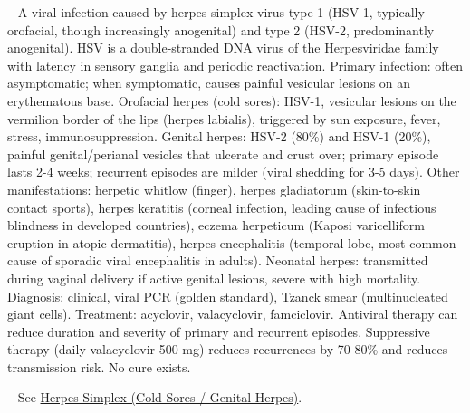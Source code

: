 -- A viral infection caused by herpes simplex virus type 1 (HSV-1, typically orofacial, though increasingly anogenital) and type 2 (HSV-2, predominantly anogenital). HSV is a double-stranded DNA virus of the Herpesviridae family with latency in sensory ganglia and periodic reactivation. Primary infection: often asymptomatic; when symptomatic, causes painful vesicular lesions on an erythematous base. Orofacial herpes (cold sores): HSV-1, vesicular lesions on the vermilion border of the lips (herpes labialis), triggered by sun exposure, fever, stress, immunosuppression. Genital herpes: HSV-2 (80\%) and HSV-1 (20\%), painful genital/perianal vesicles that ulcerate and crust over; primary episode lasts 2-4 weeks; recurrent episodes are milder (viral shedding for 3-5 days). Other manifestations: herpetic whitlow (finger), herpes gladiatorum (skin-to-skin contact sports), herpes keratitis (corneal infection, leading cause of infectious blindness in developed countries), eczema herpeticum (Kaposi varicelliform eruption in atopic dermatitis), herpes encephalitis (temporal lobe, most common cause of sporadic viral encephalitis in adults). Neonatal herpes: transmitted during vaginal delivery if active genital lesions, severe with high mortality. Diagnosis: clinical, viral PCR (golden standard), Tzanck smear (multinucleated giant cells). Treatment: acyclovir, valacyclovir, famciclovir. Antiviral therapy can reduce duration and severity of primary and recurrent episodes. Suppressive therapy (daily valacyclovir 500 mg) reduces recurrences by 70-80\% and reduces transmission risk. No cure exists.

-- See \hyperlink{Herpes Simplex (Cold Sores / Genital Herpes)}{Herpes Simplex (Cold Sores / Genital Herpes)}.

